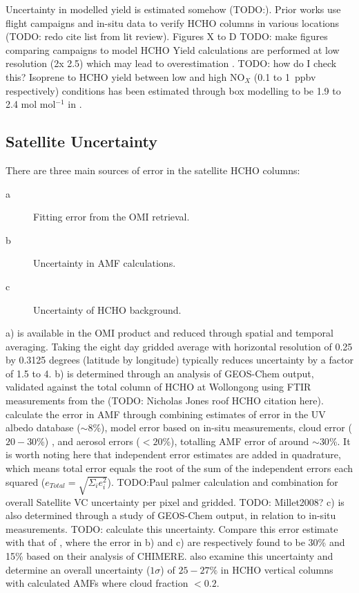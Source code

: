    
    Uncertainty in modelled yield is estimated somehow (TODO:).
    Prior works use flight campaigns and in-situ data to verify HCHO columns in various locations (TODO: redo cite list from lit review).
    Figures X to D TODO: make figures comparing campaigns to model HCHO
    Yield calculations are performed at low resolution (2\degr x 2.5\degr) which may lead to overestimation \parencite{Yu2016}.
    TODO: how do I check this?
    Isoprene to HCHO yield between low and high NO$_X$ (0.1 to 1~ppbv respectively) conditions has been estimated through box modelling to be 1.9 to 2.4 mol mol$^{-1}$ in \textcite{Bauwens2016}.
    
  \subsection{Satellite Uncertainty}
    \label{BioIsop:Uncertianty:Satellite}
    
    There are three main sources of error in the satellite HCHO columns:
    \begin{description}
      \item[a] Fitting error from the OMI retrieval.
      \item[b] Uncertainty in AMF calculations.
      \item[c] Uncertainty of HCHO background.
    \end{description}
    a) is available in the OMI product and reduced through spatial and temporal averaging.
    Taking the eight day gridded average with horizontal resolution of 0.25 by 0.3125 degrees (latitude by longitude) typically reduces uncertainty by a factor of 1.5 to 4.
    b) is determined through an analysis of GEOS-Chem output, validated against the total column of HCHO at Wollongong using FTIR measurements from the (TODO: Nicholas Jones roof HCHO citation here).
    \textcite{Palmer2006} calculate the error in AMF through combining estimates of error in the UV albedo database ($\sim 8$\%), model error based on in-situ measurements, cloud error  ($20-30$\%) \parencite{Martin2003}, and aerosol errors ($<20$\%), totalling AMF error of around $\sim 30$\%.
    It is worth noting here that independent error estimates are added in quadrature, which means total error equals the root of the sum of the independent errors each squared ($e_{Total}=\sqrt{\Sigma_i e_i^2}$).
    TODO:Paul palmer calculation and combination for overall Satellite VC uncertainty per pixel and gridded.
    TODO: Millet2008?
    c) is also determined through a study of GEOS-Chem output, in relation to in-situ measurements.
    TODO: calculate this uncertainty.
    Compare this error estimate with that of \textcite{Curci2010}, where the error in b) and c) are respectively found to be 30\% and 15\% based on their analysis of CHIMERE.
    \textcite{Millet2008} also examine this uncertainty and determine an overall uncertainty ($1\sigma$) of $25-27\%$ in HCHO vertical columns with calculated AMFs where cloud fraction $< 0.2$.
    
